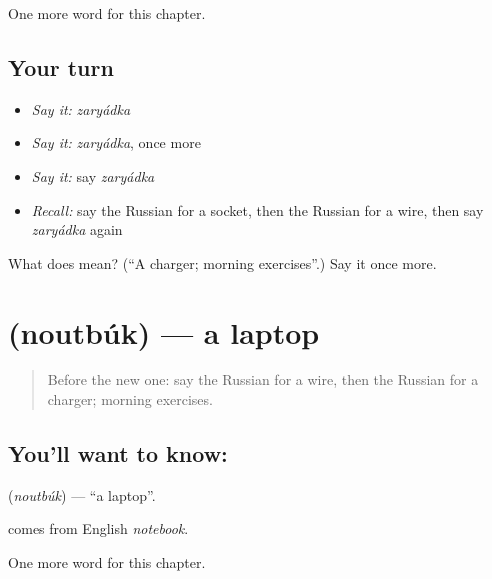 \begin{grammarlens}[title={What you've built}]
One more word for this chapter.
\end{grammarlens}

\subsection*{Your turn}
\begin{itemize}
\raggedright
  \item \emph{Say it:} \emph{zaryádka}
  \item \emph{Say it:} \emph{zaryádka}, once more
  \item \emph{Say it:} say \emph{zaryádka}
  \item \emph{Recall:} say the Russian for a socket, then the Russian for a wire, then say \emph{zaryádka} again
\end{itemize}

\begin{tcolorbox}[breakable,colback=teal!4,colframe=teal!35!black,title={Before you move on}]
What does  mean? (\textquotedblleft{}A charger; morning exercises\textquotedblright{}.) Say it once more.
\end{tcolorbox}
\section[\texorpdfstring{\ru{ноутбук} (noutbúk)}{ноутбук (noutbúk)}]{ (noutbúk) — a laptop}

\label{lesson:RU-C191-noutbuk}



\begin{quote}
Before the new one: say the Russian for a wire, then the Russian for a charger; morning exercises.
\end{quote}

\subsection*{You'll want to know: }
\textbf{} (\emph{noutbúk}) — \textquotedblleft{}a laptop\textquotedblright{}.

\begin{cousinweb}
\textbf{} comes from English \emph{notebook}.
\end{cousinweb}

\begin{grammarlens}[title={What you've built}]
One more word for this chapter.
\end{grammarlens}

